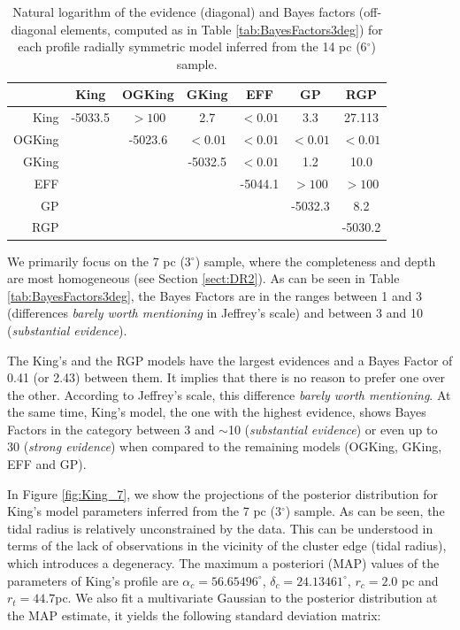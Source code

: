 \begin{table}[ht]
  \centering 
 \caption[]{Natural logarithm of the evidence (diagonal) and Bayes factors (off-diagonal elements, computed as in Table \ref{tab:BayesFactors3deg}) for each profile radially symmetric model inferred from the 14 pc (6$^{\circ}$) sample.}

\begin{tabular}{rcccccc} 
&King & OGKing & GKing & EFF & GP & RGP \\
\hline              
           King    &-5033.5  &  $>100$  &   2.7    &   $<0.01$     &  3.3       &    27.113  \\
           OGKing  &         &  -5023.6 &  $<0.01$ &   $<0.01$     &   $<0.01$  &   $<0.01$   \\
           GKing   &         &          & -5032.5  &   $<0.01$     &  1.2       &   10.0     \\
           EFF     &         &          &          &   -5044.1     &  $>100$    &   $>100$   \\
           GP      &         &          &          &               &   -5032.3    & 8.2      \\
           RGP     &         &          &          &               &              & -5030.2     \\
         \end{tabular}
 
 \label{tab:BayesFactors6deg}
   \end{table}
  


We primarily focus on the 7 pc (3$^{\circ}$) sample, where the completeness and depth are most homogeneous (see Section \ref{sect:DR2}). As can be seen in Table \ref{tab:BayesFactors3deg}, the Bayes Factors are in the ranges between 1 and 3 (differences \emph{barely worth mentioning} in Jeffrey's scale) and between 3 and 10 (\emph{substantial evidence}).

The King's and the RGP models have the largest evidences and a Bayes Factor of 0.41 (or 2.43) between them. It implies that there is no reason to prefer one over the other. According to Jeffrey's scale, this difference \emph{barely worth mentioning}. At the same time, King's model, the one with the highest evidence, shows Bayes Factors in the category between 3 and $\sim$10 (\emph{substantial evidence}) or even up to 30 (\emph{strong evidence}) when compared to the remaining models (OGKing, GKing, EFF and GP).  

In Figure \ref{fig:King_7}, we show the projections of the posterior distribution for King's model parameters inferred from the 7 pc (3$^{\circ}$) sample. As can be seen, the tidal radius is relatively unconstrained by the data. This can be understood in terms of the lack of observations in the vicinity of the cluster edge (tidal radius), which introduces a degeneracy. The maximum a posteriori (MAP) values of the parameters of King's profile are $\alpha_c=56.65496^{\circ}$, $\delta_c=24.13461^{\circ}$, $r_c=2.0$ pc and $r_t=44.7$pc. We also fit a multivariate Gaussian to the posterior distribution at the MAP estimate, it yields the following standard deviation matrix:

